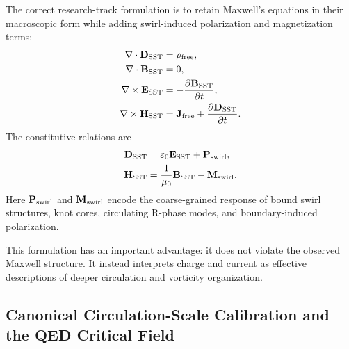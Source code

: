     The correct research-track formulation is to retain Maxwell's equations
    in their macroscopic form while adding swirl-induced polarization and
    magnetization terms:
    \begin{align}
        \nabla\cdot\mathbf{D}_{\rm SST}
        &=
        \rho_{\rm free},
        \label{eq:SST_gauss_D}
        \\
        \nabla\cdot\mathbf{B}_{\rm SST}
        &=
        0,
        \label{eq:SST_gauss_B}
        \\
        \nabla\times\mathbf{E}_{\rm SST}
        &=
        -
        \frac{\partial\mathbf{B}_{\rm SST}}{\partial t},
        \label{eq:SST_faraday}
        \\
        \nabla\times\mathbf{H}_{\rm SST}
        &=
        \mathbf{J}_{\rm free}
        +
        \frac{\partial\mathbf{D}_{\rm SST}}{\partial t}.
        \label{eq:SST_ampere}
    \end{align}
    The constitutive relations are
    \begin{align}
        \mathbf{D}_{\rm SST}
        &=
        \varepsilon_0\mathbf{E}_{\rm SST}
        +
        \mathbf{P}_{\rm swirl},
        \label{eq:D_constitutive_swirl}
        \\
        \mathbf{H}_{\rm SST}
        &=
        \frac{1}{\mu_0}\mathbf{B}_{\rm SST}
        -
        \mathbf{M}_{\rm swirl}.
        \label{eq:H_constitutive_swirl}
    \end{align}
    Here \(\mathbf{P}_{\rm swirl}\) and \(\mathbf{M}_{\rm swirl}\) encode the
    coarse-grained response of bound swirl structures, knot cores, circulating
    R-phase modes, and boundary-induced polarization.
    
    This formulation has an important advantage: it does not violate the
    observed Maxwell structure.  It instead interprets charge and current as
    effective descriptions of deeper circulation and vorticity organization.

\subsection{Canonical Circulation-Scale Calibration and the QED Critical Field}
    
